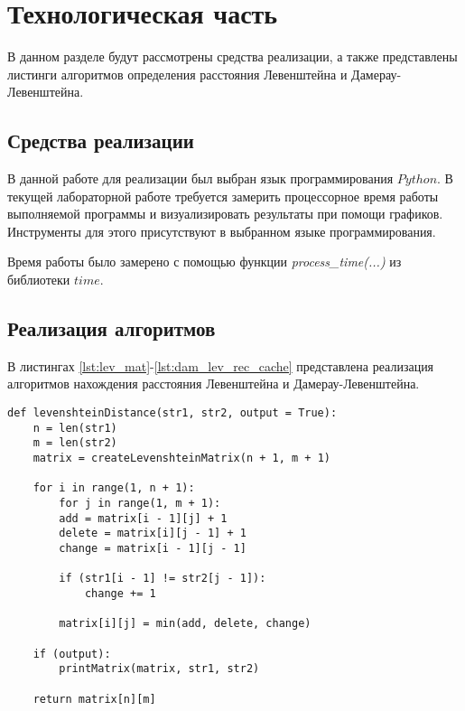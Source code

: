 \chapter{Технологическая часть}

В данном разделе будут рассмотрены средства реализации, а также представлены листинги алгоритмов определения расстояния Левенштейна и Дамерау-Левенштейна.

\section{Средства реализации}
В данной работе для реализации был выбран язык программирования $Python$. В текущей лабораторной работе требуется замерить процессорное время работы выполняемой программы
и визуализировать результаты при помощи графиков. Инструменты для этого присутствуют в выбранном языке программирования.

Время работы было замерено с помощью функции \textit{process\_time(...)} из библиотеки $time$.


\section{Реализация алгоритмов}

В листингах \ref{lst:lev_mat}-\ref{lst:dam_lev_rec_cache} представлена реализация алгоритмов нахождения расстояния Левенштейна и Дамерау-Левенштейна.

\clearpage

\begin{center}
    \captionsetup{justification=raggedright,singlelinecheck=off}
    \begin{lstlisting}[label=lst:lev_mat,caption=Алгоритм нахождения расстояния Левенштейна (матричный)]
def levenshteinDistance(str1, str2, output = True):
	n = len(str1)
	m = len(str2)
	matrix = createLevenshteinMatrix(n + 1, m + 1)
	
	for i in range(1, n + 1):
		for j in range(1, m + 1):
		add = matrix[i - 1][j] + 1
		delete = matrix[i][j - 1] + 1
		change = matrix[i - 1][j - 1]
		
		if (str1[i - 1] != str2[j - 1]):
			change += 1
		
		matrix[i][j] = min(add, delete, change)
	
	if (output):
		printMatrix(matrix, str1, str2)
	
	return matrix[n][m]
\end{lstlisting}
\end{center}


